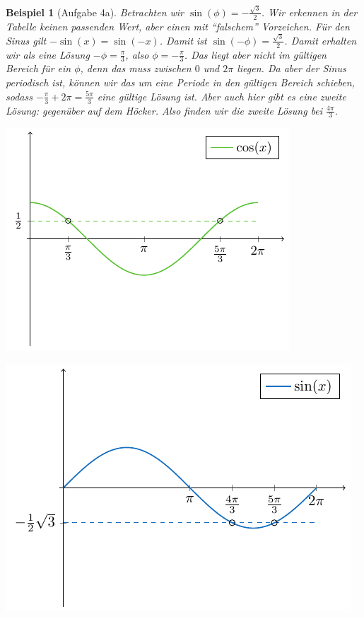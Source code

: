 \documentclass[ngerman, a4paper, 11pt]{article}
\theoremstyle{nonumberplain}
\newtheorem{beispiel}{Beispiel}
\begin{document}
\begin{beispiel}[Aufgabe 4a]
\begin{minipage}{\dimexpr0.5\linewidth-\fboxrule-\fboxsep}
			Betrachten wir $\sin(\phi) = - \frac{\sqrt{3}}{2}$. Wir erkennen in der Tabelle keinen passenden Wert, aber einen mit \enquote{falschem} Vorzeichen. Für den Sinus gilt $-\sin(x) = \sin(-x)$. Damit ist $\sin(-\phi) = \frac{\sqrt{3}}{2}$. Damit erhalten wir als \textit{eine} Lösung $-\phi = \frac{\pi}{3}$, also $\phi = -\frac{\pi}{3}$. Das liegt aber nicht im gültigen Bereich für ein $\phi$, denn das muss zwischen $0$ und $2\pi$ liegen. Da aber der Sinus periodisch ist, können wir das um eine Periode in den gültigen Bereich schieben, sodass $-\frac{\pi}{3} + 2\pi = \frac{5\pi}{3}$ eine gültige Lösung ist. Aber auch hier gibt es eine zweite Lösung: gegenüber auf dem Höcker. Also finden wir die zweite Lösung bei $\frac{4\pi}{3}$.
		\end{minipage}
		\hfill
		\begin{minipage}{\dimexpr0.5\linewidth-\fboxrule-\fboxsep}
			\includegraphics[width=\linewidth]{tut01-umrechnungen-abb-cos} 
			
			\includegraphics[width=\linewidth]{tut01-umrechnungen-abb-sin}
		\end{minipage}		
		

\end{beispiel}
\end{document}
